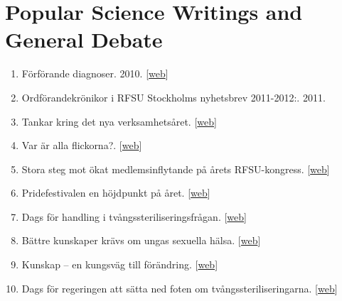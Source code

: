 \documentclass[10pt,a4paper,twocolumn]{article}
\begin{document}
\section{Popular Science Writings and General Debate}
\begin{enumerate}

    \item Förförande diagnoser. 2010. [\href{http://www.ottar.se/artiklar/f-rf-rande-diagnoser}{web}]

    \item Ordförandekrönikor i RFSU Stockholms nyhetsbrev 2011-2012:. 2011.

    \item Tankar kring det nya verksamhetsåret. [\href{http://www.rfsu.se/sv/RFSU-nara-dig/RFSU-Stockholm/Nyhetsbrev/Mars-2011/Ordforandens-rader/}{web}]

    \item Var är alla flickorna?. [\href{http://www.rfsu.se/sv/RFSU-nara-dig/RFSU-Stockholm/Nyhetsbrev/Nummer-3/Var-ar-alla-flickorna/}{web}]

    \item Stora steg mot ökat medlemsinflytande på årets RFSU-kongress. [\href{http://www.rfsu.se/sv/RFSU-nara-dig/RFSU-Stockholm/Nyhetsbrev/Nummer-4-2011/Stora-steg-mot-okat-medlemsinflytande-pa-arets-RFSU-kongress/}{web}]

    \item Pridefestivalen en höjdpunkt på året. [\href{http://www.rfsu.se/sv/RFSU-nara-dig/RFSU-Stockholm/Nyhetsbrev/Nummer-5-2011/Pridefestivalen-en-hojdpunkt-pa-aret/}{web}]

    \item Dags för handling i tvångssteriliseringsfrågan. [\href{http://www.rfsu.se/sv/RFSU-nara-dig/RFSU-Stockholm/Nyhetsbrev/Nyhetsbrev-52011/Dags-for-handling-i-tvangssteriliseringsfragan/}{web}]

    \item Bättre kunskaper krävs om ungas sexuella hälsa. [\href{http://www.rfsu.se/sv/RFSU-nara-dig/RFSU-Stockholm/Nyhetsbrev/Nyhetsbrev-72011/Battre-kunskaper-kravs-om-ungdomars-sexuella-halsa/}{web}]

    \item Kunskap – en kungsväg till förändring. [\href{http://www.rfsu.se/sv/RFSU-nara-dig/RFSU-Stockholm/Nyhetsbrev/Nyhetsbrev-72011/Battre-kunskaper-kravs-om-ungdomars-sexuella-halsa/}{web}]

    \item Dags för regeringen att sätta ned foten om tvångssteriliseringarna. [\href{http://www.rfsu.se/sv/RFSU-nara-dig/RFSU-Stockholm/Nyhetsbrev/Nyhetsbrev-12012/Dags-for-regeringen-att-satta-ned-foten-om-tvangssteriliseringarna/}{web}]


\end{enumerate}
\end{document}
